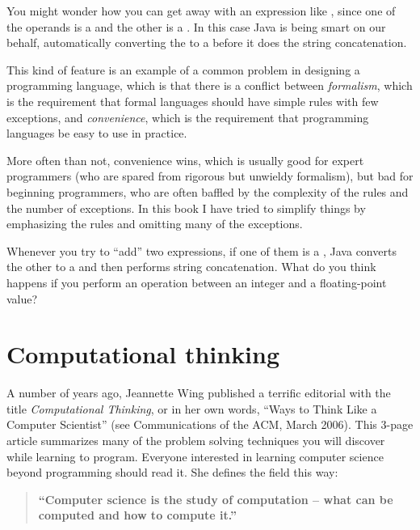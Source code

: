 

You might wonder how you can get away with an expression like , since one of the operands is a 
and the other is a .  In this case Java is being
smart on our behalf, automatically converting the  to a
 before it does the string concatenation.

This kind of feature is an example of a common problem in designing a
programming language, which is that there is a conflict between {\em
formalism}, which is the requirement that formal languages should have
simple rules with few exceptions, and {\em convenience}, which is the
requirement that programming languages be easy to use in practice.

More often than not, convenience wins, which is usually good for
expert programmers (who are spared from rigorous but unwieldy
formalism), but bad for beginning programmers, who are often baffled
by the complexity of the rules and the number of exceptions.  In this
book I have tried to simplify things by emphasizing the rules and
omitting many of the exceptions.

Whenever you try to ``add'' two
expressions, if one of them is a , Java converts the
other to a  and then performs string concatenation.
What do you think happens if you perform an operation between
an integer and a floating-point value?


\section{Computational thinking}

A number of years ago, Jeannette Wing published a terrific editorial with the title {\it Computational Thinking}, or in her own words, ``Ways to Think Like a Computer Scientist'' (see Communications of the ACM, March 2006).
This 3-page article summarizes many of the problem solving techniques you will discover while learning to program.
Everyone interested in learning computer science beyond programming should read it.
She defines the field this way:


\begin{quote}
{\bf ``Computer science is the study of computation -- what can be computed and how to compute it.''}
\end{quote}


